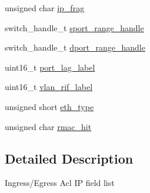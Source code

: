 \begin{DoxyCompactItemize}
\item 
unsigned char \hyperlink{unionswitch__acl__ip__value___a0d15a0ce91b2fd8dd6077487bf8f20db}{ip\+\_\+frag}
\item 
switch\+\_\+handle\+\_\+t \hyperlink{unionswitch__acl__ip__value___aa1ebf3b5531ac34096302414c28b12eb}{sport\+\_\+range\+\_\+handle}
\item 
switch\+\_\+handle\+\_\+t \hyperlink{unionswitch__acl__ip__value___ac2ae8fe982d3f5d4148c30a9b93e1edf}{dport\+\_\+range\+\_\+handle}
\item 
uint16\+\_\+t \hyperlink{unionswitch__acl__ip__value___ad6771696d2681953785bea84120136f5}{port\+\_\+lag\+\_\+label}
\item 
uint16\+\_\+t \hyperlink{unionswitch__acl__ip__value___a16ec22e63d7d41e074fe38607915283a}{vlan\+\_\+rif\+\_\+label}
\item 
unsigned short \hyperlink{unionswitch__acl__ip__value___a450d8940dd6243b46ead5165dc6edab0}{eth\+\_\+type}
\item 
unsigned char \hyperlink{unionswitch__acl__ip__value___ae494fb4f2b504ed074d458ab8b4fc538}{rmac\+\_\+hit}
\end{DoxyCompactItemize}


\subsection{Detailed Description}
Ingress/\+Egress Acl I\+P field list 

